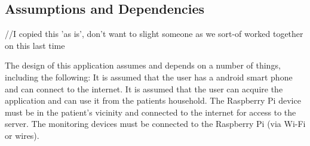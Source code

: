 \subsection{Assumptions and Dependencies}
//I copied this 'as is', don't want to slight someone as we sort-of worked together on this last time


The design of this application assumes and depends on a number of things,
including the following: It is assumed that the user has a android smart phone and can
connect to the internet. It is assumed that the user can acquire the application
and can use it from the patients household. The Raspberry Pi device must be in the patient's 
vicinity and connected to the internet for access to the server. The monitoring devices must be connected to 
the Raspberry Pi (via Wi-Fi or wires). 